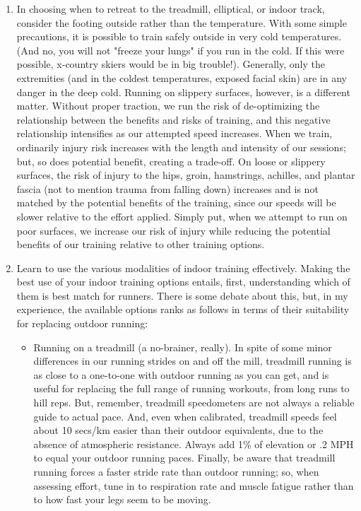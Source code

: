\begin{enumerate}
    \item In choosing when to retreat to the treadmill, elliptical, or indoor track, consider the footing outside rather than the temperature. With some simple precautions, it is possible to train safely outside in very cold temperatures. (And no, you will not "freeze your lungs" if you run in the cold. If this were possible, x-country skiers would be in big trouble!). Generally, only the extremities (and in the coldest temperatures, exposed facial skin) are in any danger in the deep cold. Running on slippery surfaces, however, is a different matter. Without proper traction, we run the risk of de-optimizing the relationship between the benefits and risks of training, and this negative relationship intensifies as our attempted speed increases. When we train, ordinarily injury risk increases with the length and intensity of our sessions; but, so does potential benefit, creating a trade-off. On loose or slippery surfaces, the risk of injury to the hips, groin, hamstrings, achilles, and plantar fascia (not to mention trauma from falling down) increases and is not matched by the potential benefits of the training, since our speeds will be slower relative to the effort applied. Simply put, when we attempt to run on poor surfaces, we increase our risk of injury while reducing the potential benefits of our training relative to other training options.

    \item Learn to use the various modalities of indoor training effectively. Making the best use of your indoor training options entails, first, understanding which of them is best match for runners. There is some debate about this, but, in my experience, the available options ranks as follows in terms of their suitability for replacing outdoor running:
        \begin{itemize}
            \item Running on a treadmill (a no-brainer, really). In spite of some minor differences in our running strides on and off the mill, treadmill running is as close to a one-to-one with outdoor running as you can get, and is useful for replacing the full range of running workouts, from long runs to hill reps. But, remember, treadmill speedometers are not always a reliable guide to actual pace. And, even when calibrated, treadmill speeds feel about 10 secs/km easier than their outdoor equivalents, due to the absence of atmospheric resistance. Always add 1\% of elevation or .2 MPH to equal your outdoor running paces. Finally, be aware that treadmill running forces a faster stride rate than outdoor running; so, when assessing effort, tune in to respiration rate and muscle fatigue rather than to how fast your legs seem to be moving.


\end{itemize}
\end{enumerate}
